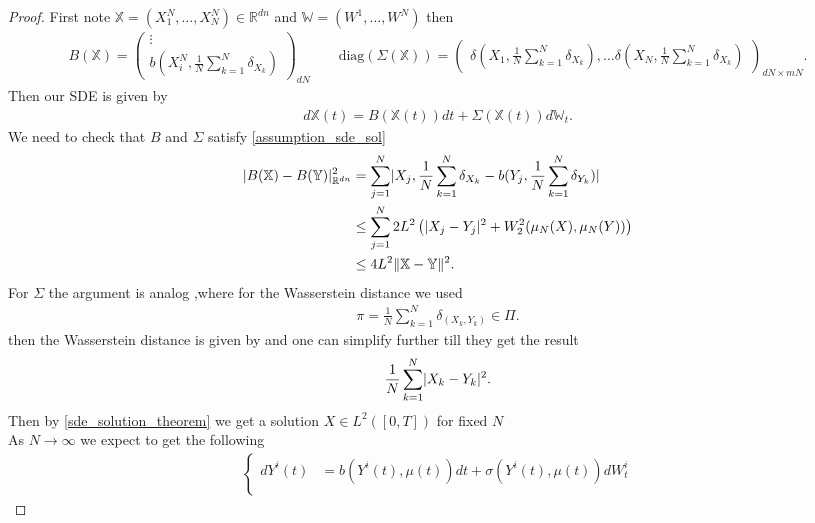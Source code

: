 \begin{proof}
  First note $\mathbb{X} = (X_1^{N},\ldots ,X_N^{N}  ) \in  \mathbb{R}^{dn} $ and $\mathbb{W} = (W^{1},\ldots ,W^{N}  )$ then 
  \begin{align*}
    B(\mathbb{X}) = \begin{pmatrix} \vdots \\ b(X_i^{N},\frac{1}{N}\sum_{k=1}^{N}  \delta_{X_k} ) \end{pmatrix}_{dN}  \qquad \text{diag}(\Sigma(\mathbb{X})) = \begin{pmatrix} \delta(X_1,\frac{1}{N}\sum_{k=1}^{N} \delta_{X_k} ), \ldots \delta(X_N,\frac{1}{N}\sum_{k=1}^{N} \delta_{X_k} ) \end{pmatrix}_{dN \times mN}
  .\end{align*}
  Then our SDE is given by 
  \begin{align*}
    d \mathbb{X}(t) = B(\mathbb{X}(t)) dt + \Sigma(\mathbb{X}(t)) d \mathbb{W}_t
  .\end{align*}
  We need to check that $B$ and $\Sigma $ satisfy \autoref{assumption_sde_sol} 
  \begin{align*}
    \lvert B(\mathbb{X})-B(\mathbb{Y})\rvert_{\mathbb{R}^{dn} }^2  &= \sum_{j=1}^{N} \lvert X_j,\frac{1}{N}\sum_{k=1}^{N} \delta_{X_k}  - b(Y_j,\frac{1}{N}\sum_{k=1}^{N} \delta_{Y_k} )\rvert  \\
                                                            &\le \sum_{j=1}^{N} 2L^2 \left( \lvert X_j-Y_j\rvert^2  + W_2^2(\mu_N(X),\mu_N(Y))\right)   \\
                                                            &\le  4L^2 \|\mathbb{X} - \mathbb{Y}\|^2 
  .\end{align*}
  For $\Sigma $ the argument is analog ,where for the Wasserstein distance we used 
  \begin{align*}
    \pi  = \frac{1}{N} \sum_{k=1}^{N} \delta_{(X_k,Y_k)}  \in  \Pi
  .\end{align*}
  then  the Wasserstein distance is given by and one can simplify further till they get the result
  \begin{align*}
   \frac{1}{N}\sum_{k=1}^{N} \lvert X_k-Y_k\rvert^2  
  .\end{align*}
  Then by \autoref{sde_solution_theorem} we get a solution $X \in  L^2([0,T])$ for fixed $N$\\[1ex]
  As $N \to \infty$ we expect to get the following 
  \begin{align*}
    \begin{cases}
      dY^{i}(t) &= b(Y^{i}(t) ,\mu(t) ) dt + \sigma(Y^{i}(t),\mu(t) )dW_t^i \\

\end{cases}
\end{align*}
\end{proof}
